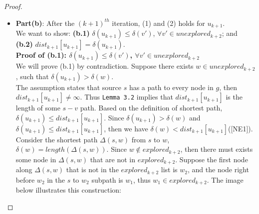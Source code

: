 \begin{proof}
\begin{itemize}
\[\begin{cases}
          dist_j[q] & otherwise 
        \end{cases}
        \right\}
      \]
  \\
  Since $dist_{i+1}[q] = \delta(q) \leq length(p)$ for all path $p$ from $s$ to $q$, then for each proceeding $j^{th}$ iteration after the $i^{th}$ iteration, there does not exists such $q''$ such that $dist_j[q''] + weight(q'', q) < \delta(q) = dist_{i+1}[q]$. Hence $dist_{j+1}[q] = \delta(q) = dist_{i+1}[q], \forall j > i$. Since $k+1 > i$, then for all $q \in S$, $dist_{k+1} = \delta(q) = dist_{i+1}[q]$. (2) holds for $explored_{k+1}$. 
  \\\\
  Hence we have proved that both (1) and (2) holds for all nodes in $explored_{k+1}$.




  \item \textbf{\large{Part(b)}}: After the $(k+1)^{th}$ iteration, (1) and (2) holds for $u_{k+1}$. 
  \\
  We want to show: \textbf{(b.1)} $\delta(u_{k+1}) \leq \delta(v')$, $\forall v' \in unexplored_{k+2}$; and \textbf{(b.2)} $dist_{k+1}[u_{k+1}] = \delta(u_{k+1})$. 
  \\
  \textbf{Proof of (b.1): $\delta(u_{k+1}) \leq \delta(v')$, $\forall v' \in unexplored_{k+2}$}
  \\
  We will prove (b.1) by contradiction. Suppose there exists $w \in unexplored_{k+2}$, such that $\delta(u_{k+1}) > \delta(w)$. 
  \\
  The assumption states that source $s$ has a path to every node in $g$, then $dist_{k+1}[u_{k+1}] \neq \infty$. Thus \texttt{Lemma 3.2} implies that $dist_{k+1}[u_{k+1}]$ is the length of some $s-v$ path. Based on the definition of shortest path, $\delta(u_{k+1}) \leq dist_{k+1}[u_{k+1}]$. Since $\delta(u_{k+1}) > \delta(w)$ and $\delta(u_{k+1}) \leq dist_{k+1}[u_{k+1}]$, then we have $\delta(w) < dist_{k+1}[u_{k+1}]$([NE1]). 
  \\
  Consider the shortest path $\Delta(s, w)$ from $s$ to $w$, $\delta(w) = length(\Delta(s, w))$. Since $w \notin explored_{k+2}$, then there must exists some node in $\Delta(s, w)$ that are not in $explored_{k+2}$. Suppose the first node along $\Delta(s, w)$ that is not in the $explored_{k+2}$ list is $w_2$, and the node right before $w_2$ in the $s$ to $w_2$ subpath is $w_1$, thus $w_1 \in explored_{k+2}$. The image below illustrates this construction: 

\end{itemize}
\end{proof}
